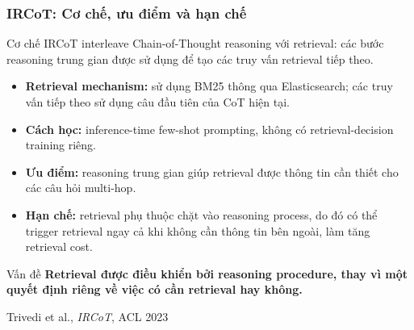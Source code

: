 
\begin{frame}
    \frametitle{IRCoT: Cơ chế, ưu điểm và hạn chế}

    \small

    \begin{block}{Cơ chế}
        IRCoT interleave Chain-of-Thought reasoning với retrieval:
        các bước reasoning trung gian được sử dụng để tạo các
        truy vấn retrieval tiếp theo.
    \end{block}

    \vspace{0.15cm}

    \begin{itemize}
        \setlength{\itemsep}{4pt}

        \item \textbf{Retrieval mechanism:}
        sử dụng BM25 thông qua Elasticsearch; các truy vấn tiếp theo
        sử dụng câu đầu tiên của CoT hiện tại.

        \item \textbf{Cách học:}
        inference-time few-shot prompting, không có
        retrieval-decision training riêng.

        \item \textbf{Ưu điểm:}
        reasoning trung gian giúp retrieval được thông tin cần thiết
        cho các câu hỏi multi-hop.

        \item \textbf{Hạn chế:}
        retrieval phụ thuộc chặt vào reasoning process, do đó có thể
        trigger retrieval ngay cả khi không cần thông tin bên ngoài,
        làm tăng retrieval cost.

    \end{itemize}

    \vspace{0.1cm}

    \begin{block}{Vấn đề}
        \centering
        \textbf{Retrieval được điều khiển bởi reasoning procedure,
        thay vì một quyết định riêng về việc có cần retrieval hay không.}
    \end{block}

    \vspace{0.02cm}

    \begin{center}
        \scriptsize
        Trivedi et al., \textit{IRCoT}, ACL 2023
    \end{center}

\end{frame}


